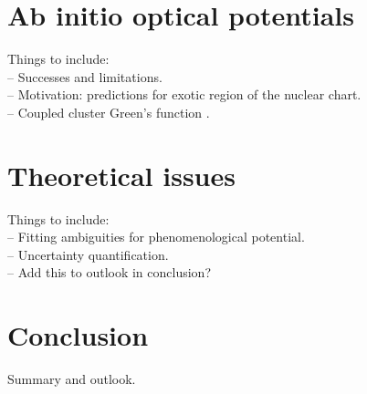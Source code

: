 \documentclass[preprintnumbers,floatfix,aps,prc,preprint,nofootinbib]{revtex4-1}
\begin{document}
\section{Ab initio optical potentials} %
\label{sec:section_3}


Things to include:
\\
-- Successes and limitations.
\\
-- Motivation: predictions for exotic region of the nuclear chart.
\\
-- Coupled cluster Green's function \cite{Rotureau:2016jpf}.


\section{Theoretical issues}
\label{sec:section_4}


Things to include:
\\
-- Fitting ambiguities for phenomenological potential.
\\
-- Uncertainty quantification.
\\
-- Add this to outlook in conclusion?


\section{Conclusion}
\label{sec:conclusion}


Summary and outlook.





\end{document}
